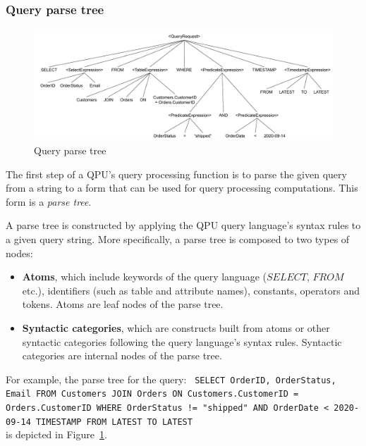 \subsubsection{Query parse tree}

\begin{figure}[t]
  \centering
    \includegraphics[width=\textwidth]{./figures/design_pattern/parse_tree.pdf}
  \caption{Query parse tree}
  \label{fig:parse_tree}
\end{figure}

The first step of a QPU's query processing function is to parse the given query from a string to a form that can be used
for query processing computations.
This form is a \textit{parse tree}.

A parse tree is constructed by applying the QPU query language's syntax rules to a given query string.
More specifically, a parse tree is composed to two types of nodes:

\begin{itemize}
  \item \textbf{Atoms}, which include keywords of the query language ($SELECT$, $FROM$ etc.),
  identifiers (such as table and attribute names), constants, operators and tokens.
  Atoms are leaf nodes of the parse tree.

  \item \textbf{Syntactic categories}, which are constructs built from atoms or other syntactic categories
  following the query language's syntax rules.
  Syntactic categories are internal nodes of the parse tree.
\end{itemize}

\noindent
For example, the parse tree for the query:
{\obeylines\obeyspaces
\texttt{
        SELECT OrderID, OrderStatus, Email
        FROM Customers JOIN Orders ON Customers.CustomerID = Orders.CustomerID
        WHERE OrderStatus != "shipped" AND OrderDate < 2020-09-14
        TIMESTAMP FROM LATEST TO LATEST
        }}
~ \\
\noindent
is depicted in Figure~\ref{fig:parse_tree}.

